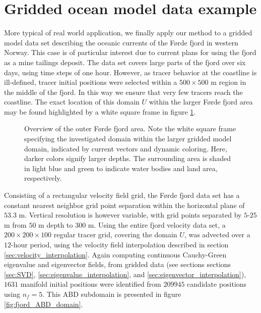\section{Gridded ocean model data example}\label{sec:fjord}

More typical of real world application, we finally apply our method to a gridded model data set describing the oceanic currents of the Førde fjord in western Norway. This case is of particular interest due to current plans for using the fjord as a mine tailings deposit. The data set covers large parts of the fjord over six days, using time steps of one hour. However, as tracer behavior at the coastline is ill-defined, tracer initial positions were selected within a $500\times 500$ m region in the middle of the fjord. In this way we ensure that very few tracers reach the coastline. The exact location of this domain $U$ within the larger Førde fjord area may be found highlighted by a white square frame in figure \ref{fig:map}. 

\begin{figure}[h!] 
\centering
\resizebox{0.9\textwidth}{!}{}
\caption{Overview of the outer Førde fjord area. Note the white square frame specifying the investigated domain within the larger gridded model domain, indicated by current vectors and dynamic coloring. Here, darker colors signify larger depths. The surrounding area is shaded in light blue and green to indicate water bodies and land area, respectively.}\label{fig:map}
\end{figure}


Consisting of a rectangular velocity field grid, the Førde fjord data set has a constant nearest neighbor grid point separation within the horizontal plane of $53.3$ m. Vertical resolution is however variable, with grid points separated by $5$-$25$ m from $50$ m depth to 300 m. Using the entire fjord velocity data set, a $200\times 200\times 100$ regular tracer grid, covering the domain $U$, was advected over a $12$-hour period, using the velocity field interpolation described in section \ref{sec:velocity_interpolation}. Again computing continuous Cauchy-Green eigenvalue and eigenvector fields, from gridded data (see sections sections \ref{sec:SVD}, \ref{sec:eigenvalue_interpolation}, and \ref{sec:eigenvector_interpolation}), $1631$ manifold initial positions were identified from $209945$ candidate positions using $n_f=5$. This ABD subdomain is presented in figure \ref{fig:fjord_ABD_domain}.

